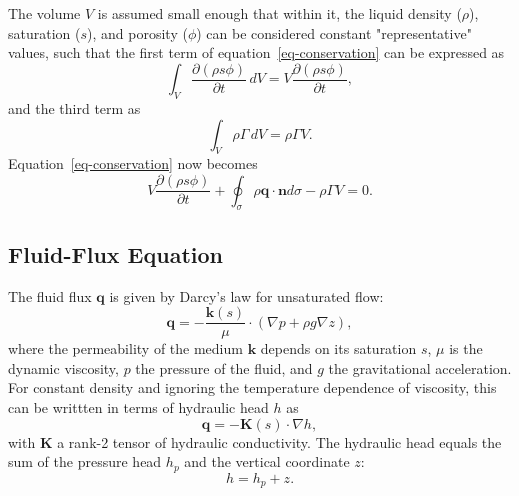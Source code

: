 \documentclass[fleqn]{article}
\begin{document}
The volume $V$ is assumed small enough that within it, the
liquid density ($\rho$), saturation ($s$), and porosity ($\phi$) can be
considered constant "representative" values, such that the first term of
equation~\ref{eq-conservation} can be expressed as
\begin{equation}
  \int_V \frac{\partial (\rho s \phi)}{\partial t} \,dV = 
  V \frac{\partial (\rho s \phi)}{\partial t},
\end{equation}
and the third term as
\begin{equation}
  \int_V \rho \Gamma \,dV = \rho \Gamma V.
\end{equation}
Equation~\ref{eq-conservation} now becomes
\begin{equation}
  V \frac{\partial (\rho s \phi)}{\partial t} +
  \oint_\sigma \rho \mathbf{q} \cdot \mathbf{n} d\sigma -
  \rho \Gamma V = 0.
\end{equation}

\subsection{Fluid-Flux Equation}
The fluid flux $\mathbf{q}$ is given by Darcy's law for unsaturated flow:
\begin{equation}
  \mathbf{q} = - \frac{\mathbf{k}(s)}{\mu} \cdot ( \nabla p + \rho g \nabla z ),
\end{equation}
where the permeability of the medium $\mathbf{k}$ depends on its saturation $s$,
$\mu$ is the dynamic viscosity, $p$ the pressure of the fluid, and $g$ the
gravitational acceleration. For constant density and ignoring the temperature
dependence of viscosity, this can be writtten in terms of hydraulic head
$h$ as
\begin{equation}
  \mathbf{q} = - \mathbf{K}(s) \cdot \nabla h,
  \label{eq-unsat-darcy-flux}
\end{equation}
with $\mathbf{K}$ a rank-2 tensor of hydraulic conductivity. The hydraulic
head equals the sum of the pressure head $h_p$ and the vertical
coordinate $z$:
\begin{equation}
  h = h_p + z.
\end{equation}
\end{document}
